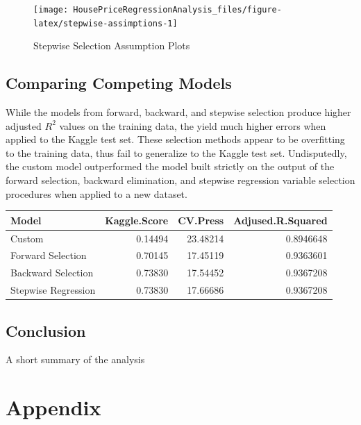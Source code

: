 \documentclass[american,]{article}
\begin{document}
\begin{figure}[htbp]

{\centering \texttt{[image: HousePriceRegressionAnalysis\_files/figure-latex/stepwise-assimptions-1]} 

}

\caption{Stepwise Selection Assumption Plots}\label{fig:stepwise-assimptions}
\end{figure}

\hypertarget{comparing-competing-models-1}{%
\subsection{Comparing Competing
Models}\label{comparing-competing-models-1}}

While the models from forward, backward, and stepwise selection produce
higher adjusted \(R^2\) values on the training data, the yield much
higher errors when applied to the Kaggle test set. These selection
methods appear to be overfitting to the training data, thus fail to
generalize to the Kaggle test set. Undisputedly, the custom model
outperformed the model built strictly on the output of the forward
selection, backward elimination, and stepwise regression variable
selection procedures when applied to a new dataset.

\begin{table}[H]
\centering
\begin{tabular}{lrrr}
\toprule
Model & Kaggle.Score & CV.Press & Adjused.R.Squared\\
\midrule
Custom & 0.14494 & 23.48214 & 0.8946648\\
Forward Selection & 0.70145 & 17.45119 & 0.9363601\\
Backward Selection & 0.73830 & 17.54452 & 0.9367208\\
Stepwise Regression & 0.73830 & 17.66686 & 0.9367208\\
\bottomrule
\end{tabular}
\end{table}

\hypertarget{conclusion-1}{%
\subsection{Conclusion}\label{conclusion-1}}

A short summary of the analysis

\hypertarget{appendix}{%
\section{Appendix}\label{appendix}}
\end{document}

